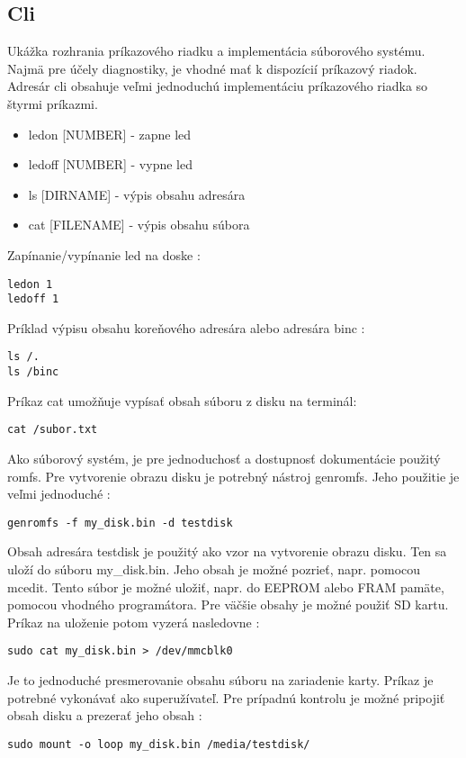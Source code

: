 \subsection{Cli}
Ukážka rozhrania príkazového riadku a implementácia súborového systému. Najmä pre účely diagnostiky, je vhodné mať k dispozícií príkazový riadok. Adresár cli obsahuje veľmi jednoduchú implementáciu príkazového riadka so štyrmi príkazmi. 

\begin{itemize}
	\item ledon [NUMBER]	- zapne led
	\item ledoff [NUMBER]	- vypne led
	\item ls [DIRNAME]	- výpis obsahu adresára
	\item cat [FILENAME]	- výpis obsahu súbora
\end{itemize}

Zapínanie/vypínanie led na doske :
{\small
\begin{verbatim}
ledon 1
ledoff 1
\end{verbatim}
}

Príklad výpisu obsahu koreňového adresára alebo adresára binc :
{\small
\begin{verbatim}
ls /.
ls /binc
\end{verbatim}
}

Príkaz cat umožňuje vypísať obsah súboru z disku na terminál:
{\small
\begin{verbatim}
cat /subor.txt
\end{verbatim}
}

Ako súborový systém, je pre jednoduchosť a dostupnosť dokumentácie použitý romfs. Pre vytvorenie obrazu disku je potrebný nástroj genromfs. Jeho použitie je veľmi jednoduché :
{\small
\begin{verbatim}
genromfs -f my_disk.bin -d testdisk
\end{verbatim}
}

Obsah adresára testdisk je použitý ako vzor na vytvorenie obrazu disku. Ten sa uloží do súboru my\_disk.bin. Jeho obsah je možné pozrieť, napr. pomocou mcedit. Tento súbor je možné uložiť, napr. do EEPROM alebo FRAM pamäte, pomocou vhodného programátora. Pre väčšie obsahy je možné použiť SD kartu. Príkaz na uloženie potom vyzerá nasledovne :
{\small
\begin{verbatim}
sudo cat my_disk.bin > /dev/mmcblk0
\end{verbatim}
}

Je to jednoduché presmerovanie obsahu súboru na zariadenie karty. Príkaz je potrebné vykonávať ako superužívateľ. Pre prípadnú kontrolu je možné pripojiť obsah disku a prezerať jeho obsah :
{\small
\begin{verbatim}
sudo mount -o loop my_disk.bin /media/testdisk/
\end{verbatim}
}
